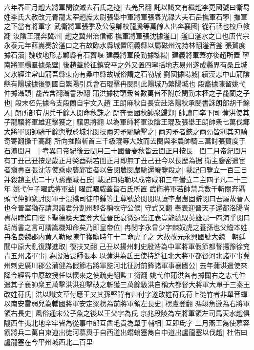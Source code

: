 六年春正月趙大將軍閔欲滅去石氏之迹|{
	去羌呂翻}
託以䜟文有繼趙李更國號曰衛易姓李氏大赦改元青龍太宰趙庶太尉張舉中軍將軍張春光祿大夫石岳撫軍石寧|{
	撫軍之下當有將軍字}
武衛將軍張季及公侯卿校龍騰等萬餘人出奔襄國|{
	從石祗也校戶教翻}
汝陰王琨奔冀州|{
	趙之冀州治信都}
撫軍將軍張沈據滏口|{
	滏口滏水之口也唐代宗永泰元年薛嵩奏於滏口之右故臨水縣城置昭義縣以屬磁州沈持林翻滏音釜}
張賀度據石瀆|{
	魏收地形志鄴縣有石竇堰}
建義將軍段勤據黎陽|{
	建義將軍蓋亦後趙所置}
寧南將軍楊羣據桑壁|{
	後趙蓋於征鎮安平之外又置四寧括地志易州遂成縣界有桑丘城又水經注常山蒲吾縣東南有桑中縣故城俗謂之石勒城}
劉國據陽城|{
	續漢志中山蒲隂縣有陽城據後劉國自繁陽引兵會石琨擊冉閔則此陽城乃繁陽城也}
段龕據陳留姚弋仲據灄頭|{
	龕苦含翻灄書涉翻}
蒲洪據枋頭衆各數萬皆不附於閔勤末柸之子龕蘭之子也|{
	段末柸先據令支段蘭自宇文入趙}
王朗麻秋自長安赴洛陽秋承閔書誅朗部胡千餘人|{
	朗所部有胡兵千餘人閔命秋誅之}
朗奔襄國秋帥衆歸鄴|{
	帥讀曰率下同}
蒲洪使其子龍驤將軍雄迎擊獲之|{
	驤思將翻}
以為軍師將軍汝陰王琨及張舉王朗帥衆七萬伐鄴大將軍閔帥騎千餘與戰於城北閔操兩刃矛馳騎擊之|{
	兩刃矛者鋏之兩㫄皆利其刃騎奇寄翻操千高翻}
所向摧陷斬首三千級琨等大敗而去閔與李農帥騎三萬討張賀度于石瀆閏月　|{
	考異曰帝紀後云閏月三十國晉春秋皆云閏正月按長　閏二月帝紀閏月有丁丑己丑按是歲正月癸酉朔若閏正月即無丁丑己丑今以長歷為据}
衛主鑒密遣宦者齎書召張沈等使乘虛襲鄴宦者以告閔農閔農馳還廢鑒殺之|{
	載記曰鑒立一百三日}
并殺趙主虎二十八孫盡滅石氏|{
	載記曰始勒以成帝咸和三年僭立二主四子凡二十三年}
姚弋仲子曜武將軍益|{
	曜武曜威蓋皆石氏所置}
武衛將軍若帥禁兵數千斬關奔灄頭弋仲帥衆討閔軍于混橋司徒申鍾等上尊號於閔閔以讓李農農固辭閔曰吾屬故晉人也今晉室猶存請與諸君分割州郡各稱牧守公侯|{
	守式又翻}
奉表迎晉天子還都洛陽尚書胡睦進曰陛下聖德應天宜登大位晉氏衰微遠竄江表豈能總馭英雄混一四海乎閔曰胡尚書之言可謂識機知命矣乃即皇帝位|{
	冉閔字永曾少字棘奴虎之養孫也父瞻本姓冉名良魏郡内黄人勒破陳午獲瞻時年十二命虎子之}
大赦改元永興國號大魏　朝廷聞中原大亂復謀進取|{
	復扶又翻}
己丑以揚州刺史殷浩為中軍將軍假節都督揚豫徐兖青五州諸軍事|{
	為殷浩喪師張本}
以蒲洪為氐王使持節征北大將軍都督河北諸軍事冀州刺史廣川郡公蒲健為假節右將軍監河北征討前鋒諸軍事襄國公|{
	去年蒲洪遣使來降今經畧中原故授任以懷來之使疏吏翻監工銜翻}
姚弋仲蒲洪各有據關右之志弋仲遣其子襄帥衆五萬擊洪洪迎擊破之斬獲三萬餘級洪自稱大都督大將軍大單于三秦王改姓苻氏|{
	洪以䜟文草付應王又其孫堅背有艸付字遂改姓苻氏苻上從竹者非單音蟬}
以南安雷弱兒為輔國將軍安定梁楞為前將軍領左長史|{
	楞盧登翻}
馮翊魚遵為右將軍領右長史|{
	風俗通宋公子魚之後以王父字為氏}
京兆段陵為左將軍領左司馬天水趙俱隴西牛夷北地辛牢皆為從事中郎互酋毛貴為單于輔相|{
	互即氐字}
二月燕王雋使慕容霸將兵二萬自東道出徒河慕輿于自西道出蠮螉塞雋自中道出盧龍塞以伐趙|{
	杜佑曰盧龍塞在今平州城西北二百里}
